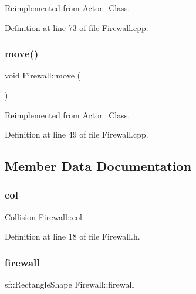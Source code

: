 Reimplemented from \hyperlink{class_actor___class_ab33216a3ce0c856bdc16231c71ae35c2}{Actor\+\_\+\+Class}.



Definition at line 73 of file Firewall.\+cpp.

\hypertarget{class_firewall_ac08bd22ea41caaa8ab269a9b1e0d36aa}{}\label{class_firewall_ac08bd22ea41caaa8ab269a9b1e0d36aa} 
\subsubsection{\texorpdfstring{move()}{move()}}
{\footnotesize\ttfamily void Firewall\+::move (\begin{DoxyParamCaption}{ }\end{DoxyParamCaption})\hspace{0.3cm}{\ttfamily [virtual]}}



Reimplemented from \hyperlink{class_actor___class_af1764a94c5410ba8476f56553cd2c327}{Actor\+\_\+\+Class}.



Definition at line 49 of file Firewall.\+cpp.



\subsection{Member Data Documentation}
\hypertarget{class_firewall_af1c215a26c43f1339ca1247f02f0d91e}{}\label{class_firewall_af1c215a26c43f1339ca1247f02f0d91e} 
\subsubsection{\texorpdfstring{col}{col}}
{\footnotesize\ttfamily \hyperlink{class_collision}{Collision} Firewall\+::col}



Definition at line 18 of file Firewall.\+h.

\hypertarget{class_firewall_aeb0bd3471e4a080461e2c4d9c8e64a4b}{}\label{class_firewall_aeb0bd3471e4a080461e2c4d9c8e64a4b} 
\subsubsection{\texorpdfstring{firewall}{firewall}}
{\footnotesize\ttfamily sf\+::\+Rectangle\+Shape Firewall\+::firewall}



